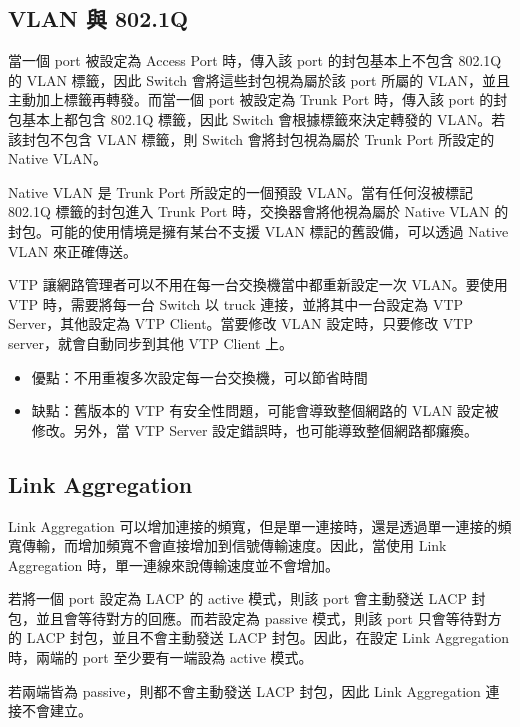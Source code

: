 \documentclass[12pt]{article}
\newenvironment{problem}[2][Problem]{\begin{trivlist}
\item[\hskip \labelsep {\bfseries #1}\hskip \labelsep {\bfseries #2}]}{\end{trivlist}}
\begin{document}
\subsection{VLAN 與 802.1Q}
\begin{problem}{1.2 (a)}
  當一個 port 被設定為 Access Port 時，傳入該 port 的封包基本上不包含 802.1Q 的 VLAN 標籤，因此 Switch 會將這些封包視為屬於該 port 所屬的 VLAN，並且主動加上標籤再轉發。而當一個 port 被設定為 Trunk Port 時，傳入該 port 的封包基本上都包含 802.1Q 標籤，因此 Switch 會根據標籤來決定轉發的 VLAN。若該封包不包含 VLAN 標籤，則 Switch 會將封包視為屬於 Trunk Port 所設定的 Native VLAN。
\end{problem}
\begin{problem}{1.2 (b)}
  Native VLAN 是 Trunk Port 所設定的一個預設 VLAN。當有任何沒被標記 802.1Q 標籤的封包進入 Trunk Port 時，交換器會將他視為屬於 Native VLAN 的封包。可能的使用情境是擁有某台不支援 VLAN 標記的舊設備，可以透過 Native VLAN 來正確傳送。
\end{problem}
\begin{problem}{1.2 (c)}
  VTP 讓網路管理者可以不用在每一台交換機當中都重新設定一次 VLAN。要使用 VTP 時，需要將每一台 Switch 以 truck 連接，並將其中一台設定為 VTP Server，其他設定為 VTP Client。當要修改 VLAN 設定時，只要修改 VTP server，就會自動同步到其他 VTP Client 上。
  \begin{itemize}
    \item 優點：不用重複多次設定每一台交換機，可以節省時間
    \vspace{-0.5em}
    \item 缺點：舊版本的 VTP 有安全性問題，可能會導致整個網路的 VLAN 設定被修改。另外，當 VTP Server 設定錯誤時，也可能導致整個網路都癱瘓。
  \end{itemize}
\end{problem}
\subsection{Link Aggregation}
\begin{problem}{1.3 (a)}
  Link Aggregation 可以增加連接的頻寬，但是單一連接時，還是透過單一連接的頻寬傳輸，而增加頻寬不會直接增加到信號傳輸速度。因此，當使用 Link Aggregation 時，單一連線來說傳輸速度並不會增加。
\end{problem}
\begin{problem}{1.3 (b)}
  若將一個 port 設定為 LACP 的 active 模式，則該 port 會主動發送 LACP 封包，並且會等待對方的回應。而若設定為 passive 模式，則該 port 只會等待對方的 LACP 封包，並且不會主動發送 LACP 封包。因此，在設定 Link Aggregation 時，兩端的 port 至少要有一端設為 active 模式。
\end{problem}
\begin{problem}{1.3 (c)}
  若兩端皆為 passive，則都不會主動發送 LACP 封包，因此 Link Aggregation 連接不會建立。
\end{problem}
\end{document}
